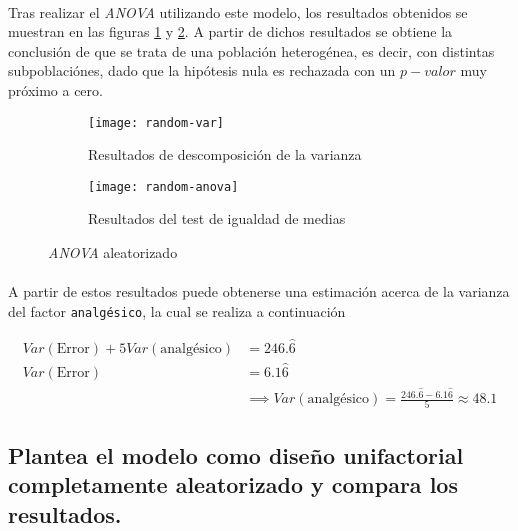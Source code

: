 \documentclass[11pt]{article}
\begin{document}
      \paragraph{}
      Tras realizar el \emph{ANOVA} utilizando este modelo, los resultados obtenidos se muestran en las figuras \ref{fig:random-anova-results-1} y \ref{fig:random-anova-results-2}. A partir de dichos resultados se obtiene la conclusión de que se trata de una población heterogénea, es decir, con distintas subpoblaciónes, dado que la hipótesis nula es rechazada con un $p-valor$ muy próximo a cero.

      \begin{figure}[!h]
        \centering
        \begin{subfigure}{.3\textwidth}
          \centering
          \texttt{[image: random-var]}
          \caption{Resultados de descomposición de la varianza}
          \label{fig:random-anova-results-1}
        \end{subfigure}%
        \begin{subfigure}{.5\textwidth}
          \centering
          \texttt{[image: random-anova]}
          \caption{Resultados del test de igualdad de medias}
          \label{fig:random-anova-results-2}
        \end{subfigure}
        \caption{\emph{ANOVA} aleatorizado}
        \label{fig:random-anova}
      \end{figure}

      \paragraph{}
      A partir de estos resultados puede obtenerse una estimación acerca de la varianza del factor \texttt{analgésico}, la cual se realiza a continuación

      \begin{align*}
        Var(\text{Error}) + 5 Var(\text{analgésico}) &= 246.\widehat{6} \\
        Var(\text{Error}) &= 6.1\widehat{6} \\
        &\implies Var(\text{analgésico}) = \frac{246.\widehat{6} - 6.1\widehat{6}}{5} \approx 48.1
      \end{align*}

    \subsection{Plantea el modelo como diseño unifactorial completamente aleatorizado y compara los resultados.}
\end{document}
